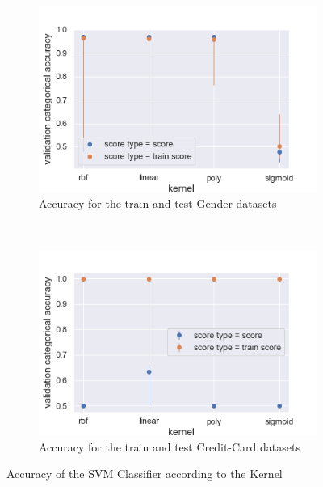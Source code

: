 \documentclass[10pt]{article}
\begin{document}
		\paragraph*{}
			\begin{figure}[h]
				\centering
				\begin{subfigure}[]{0.45\columnwidth}
					\centering
					\includegraphics[width=\linewidth]{../graphics/svm_gender_kernel_score_type_score_type.png}
					\caption{Accuracy for the train and test Gender datasets}
					\label{svm:g_train_vs_test}
				\end{subfigure}
				~
				\begin{subfigure}[]{0.45\columnwidth}
					\centering
					\includegraphics[width=\linewidth]{../graphics/svm_creditcard_kernel_score_type_score_type.png}
					\caption{Accuracy for the train and test Credit-Card datasets}
					\label{svm:cc_train_vs_test}
				\end{subfigure}
				\caption{Accuracy of the SVM Classifier according to the Kernel}
				\label{svm:train_vs_test}
			\end{figure}
\end{document}
